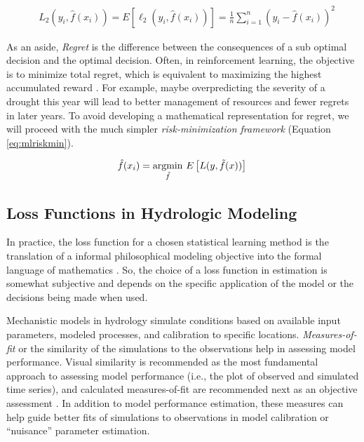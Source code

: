 \begin{equation} \label{eq:l2risk}
	\begin{aligned}
		& L_2(y_i,\hat{f}(x_i)) = E\left[\ell_2(y_i, \hat{f}(x_i))\right] = \frac{1}{n} \sum_{i=1}^{n} {(y_i-\hat{f}(x_i))^2}
	\end{aligned}
\end{equation}

As an aside, \textit{Regret} is the difference between the consequences of a sub optimal decision and the optimal decision. Often, in reinforcement learning, the objective is to minimize total regret, which is equivalent to maximizing the highest accumulated reward \cite{sutton2018reinforcement}. For example, maybe overpredicting the severity of a drought this year will lead to better management of resources and fewer regrets in later years. To avoid developing a mathematical representation for regret, we will proceed with the much simpler \textit{risk-minimization framework} (Equation \ref{eq:mlriskmin}). 

\begin{equation} \label{eq:mlriskmin}
	\hat{f}(x_i) = \underset{\tilde{f}}{\mathrm{argmin}} \ E\left[L(y, \tilde{f}(x))\right] \\
\end{equation}

\subsection{Loss Functions in Hydrologic Modeling}
In practice, the loss function for a chosen statistical learning method is the translation of a informal philosophical modeling objective into the formal language of mathematics \cite{hennig2007some}. So, the choice of a loss function in estimation is somewhat subjective and depends on the specific application of the model or the decisions being made when used. 

Mechanistic models in hydrology simulate conditions based on available input parameters, modeled processes, and calibration to specific locations. \textit{Measures-of-fit} or the similarity of the simulations to the observations help in assessing model performance. Visual similarity is recommended as the most fundamental approach to assessing model performance (i.e., the plot of observed and simulated time series), and calculated measures-of-fit are recommended next as an objective assessment \cite{krause2005comparison}. In addition to model performance estimation, these measures can help guide better fits of simulations to observations in model calibration or ``nuisance'' parameter estimation. 

